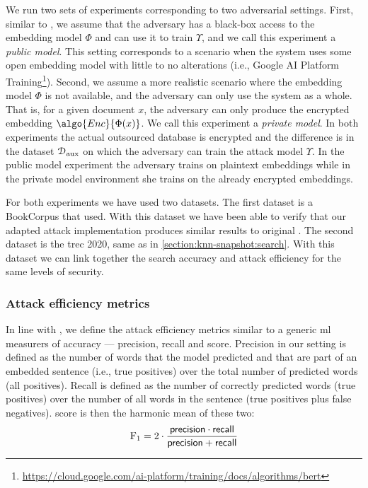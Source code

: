 			We run two sets of experiments corresponding to two adversarial settings.
			First, similar to \cite{embedding-attacks}, we assume that the adversary has a black-box access to the embedding model $\Phi$ and can use it to train $\Upsilon$, and we call this experiment a \emph{public model}.
			This setting corresponds to a scenario when the system uses some open embedding model with little to no alterations (i.e., Google AI Platform Training\footnote{
				\url{https://cloud.google.com/ai-platform/training/docs/algorithms/bert}
			}).
			Second, we assume a more realistic scenario where the embedding model $\Phi$ is not available, and the adversary can only use the system as a whole.
			That is, for a given document $x$, the adversary can only produce the encrypted embedding $\algo{Enc}{\Phi(x)}$.
			We call this experiment a \emph{private model}.
			In both experiments the actual outsourced database is encrypted and the difference is in the dataset $\mathcal{D}_\text{aux}$ on which the adversary can train the attack model $\Upsilon$.
			In the public model experiment the adversary trains on plaintext embeddings while in the private model environment she trains on the already encrypted embeddings.

			For both experiments we have used two datasets.
			The first dataset is a BookCorpus \cite{bookcorpus} that \textcite{embedding-attacks} used.
			With this dataset we have been able to verify that our adapted attack implementation produces similar results to original \cite{embedding-attacks}.
			The second dataset is the \acrshort{trec} 2020, same as in \cref{section:knn-snapshot:search}.
			With this dataset we can link together the search accuracy and attack efficiency for the same levels of security.

			\subsubsection{Attack efficiency metrics}

				In line with \cite{embedding-attacks}, we define the attack efficiency metrics similar to a generic \acrshort{ml} measurers of accuracy --- precision, recall and \FOne{} score.
				Precision in our setting is defined as the number of words that the model predicted and that are part of an embedded sentence (i.e., true positives) over the total number of predicted words (all positives).
				Recall is defined as the number of correctly predicted words (true positives) over the number of all words in the sentence (true positives plus false negatives).
				\FOne{} score is then the harmonic mean of these two:
				\[
					\text{F}_1 = 2 \cdot \frac{ \mathsf{precision} \cdot \mathsf{recall} }{ \mathsf{precision} + \mathsf{recall} }
				\]


